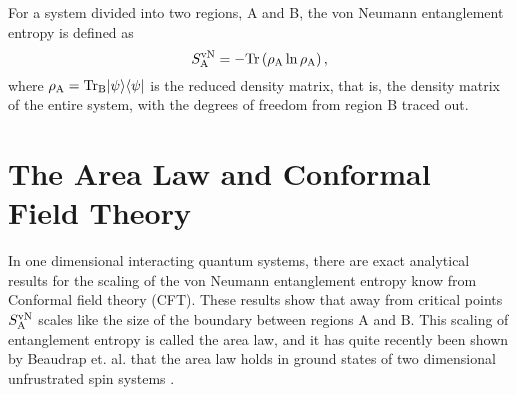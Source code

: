 For a system divided into two regions, A and B, the von Neumann entanglement entropy is defined as
\begin{equation}
	S^{\text{vN}}_\text{A} = -\rm{Tr}\left({\rho_A \ln \rho_A}\right),
\end{equation}
where $\rho_{\rm{A}}=\rm{Tr}_B\lvert {\psi} \rangle\langle {\psi} \rvert$ is the reduced density matrix, that is, the density matrix of the entire system, with the degrees of freedom from region B traced out.
\section{The Area Law and Conformal Field Theory}
In one dimensional interacting quantum systems, there are exact analytical results for the scaling of the von Neumann entanglement entropy know from Conformal field theory (CFT).
These results show that away from critical points $S^{\text{vN}}_\text{A}$ scales like the size of the boundary between regions A and B.  This scaling of entanglement entropy is called the area law, and it has quite recently been shown by Beaudrap et. al. that the area law holds in ground states of two dimensional unfrustrated spin systems \cite{DeBeaudrap2010}.


